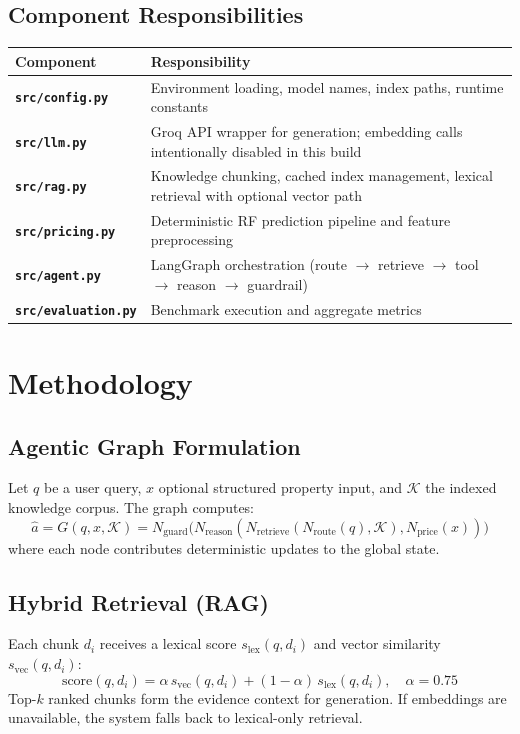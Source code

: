 \documentclass[12pt,a4paper]{article}
\begin{document}
\subsection{Component Responsibilities}
\begin{tabularx}{\linewidth}{@{}>{\bfseries}lX@{}}
\toprule
Component & Responsibility \\
\midrule
\texttt{src/config.py} & Environment loading, model names, index paths, runtime constants \\
\texttt{src/llm.py} & Groq API wrapper for generation; embedding calls intentionally disabled in this build \\
\texttt{src/rag.py} & Knowledge chunking, cached index management, lexical retrieval with optional vector path \\
\texttt{src/pricing.py} & Deterministic RF prediction pipeline and feature preprocessing \\
\texttt{src/agent.py} & LangGraph orchestration (route $\rightarrow$ retrieve $\rightarrow$ tool $\rightarrow$ reason $\rightarrow$ guardrail) \\
\texttt{src/evaluation.py} & Benchmark execution and aggregate metrics \\
\bottomrule
\end{tabularx}

\section{Methodology}
\subsection{Agentic Graph Formulation}
Let $q$ be a user query, $x$ optional structured property input, and $\mathcal{K}$ the indexed knowledge corpus. The graph computes:
\[
\hat{a} = G(q, x, \mathcal{K}) = N_{\text{guard}}\Big(N_{\text{reason}}(N_{\text{retrieve}}(N_{\text{route}}(q), \mathcal{K}), N_{\text{price}}(x))\Big)
\]
where each node contributes deterministic updates to the global state.

\subsection{Hybrid Retrieval (RAG)}
Each chunk $d_i$ receives a lexical score $s_{\text{lex}}(q,d_i)$ and vector similarity $s_{\text{vec}}(q,d_i)$:
\[
\text{score}(q,d_i) = \alpha\, s_{\text{vec}}(q,d_i) + (1-\alpha)\, s_{\text{lex}}(q,d_i), \quad \alpha=0.75
\]
Top-$k$ ranked chunks form the evidence context for generation. If embeddings are unavailable, the system falls back to lexical-only retrieval.
\end{document}

